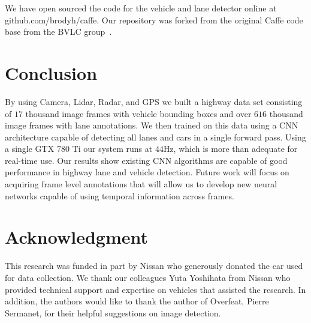 \documentclass[journal]{IEEEtran}
\begin{document}
We have open sourced the code for the vehicle and lane detector online at github.com/brodyh/caffe. Our repository was forked from the original Caffe code base from the BVLC group~\cite{jia-2014}.

\section{Conclusion}
By using Camera, Lidar, Radar, and GPS we built a highway data set consisting of $17$ thousand image frames with vehicle bounding boxes and over $616$ thousand image frames with lane annotations. We then trained on this data using a CNN architecture capable of detecting all lanes and cars in a single forward pass. Using a single GTX 780 Ti our system runs at $44$Hz, which is more than adequate for real-time use. Our results show existing CNN algorithms are capable of good performance in highway lane and vehicle detection. Future work will focus on acquiring frame level annotations that will allow us to develop new neural networks capable of using temporal information across frames.





















\section*{Acknowledgment}

This research was funded in part by Nissan who generously donated the car used for data collection. We thank our colleagues Yuta Yoshihata from Nissan who provided technical support and expertise on vehicles that assisted the research. In addition, the authors would like to thank the author of Overfeat, Pierre Sermanet, for their helpful suggestions on image detection.
\end{document}
